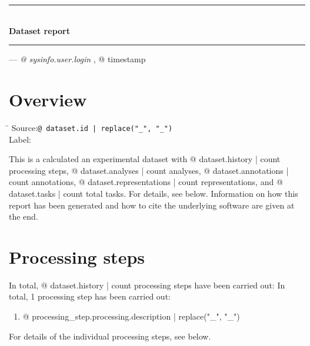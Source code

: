 

\rule[1ex]{\textwidth}{1pt}
\\[1em]
\textbf{\LARGE Dataset report}
\\[1ex]
\rule{\textwidth}{1pt}

\hfill --- \textsl{{@ sysinfo.user.login }}, {@ timestamp }

\section{Overview}

\begin{tabbing}
\hspace*{1.5cm}\=\kill
Source:\>\texttt{{@ dataset.id | replace("_", "\_") }}
\\
Label:
\end{tabbing}

This is %
a calculated %
an experimental %
dataset with
{@ dataset.history | count } processing steps,
{@ dataset.analyses | count } analyses,
{@ dataset.annotations | count } annotations,
{@ dataset.representations | count } representations, and
{@ dataset.tasks | count } total tasks.
For details, see below. Information on how this report has been generated and how to cite the underlying software are given at the end.

\section{Processing steps}

In total, {@ dataset.history | count } processing steps have been carried out:
In total, 1 processing step has been carried out:

\begin{enumerate}
\item {@ processing_step.processing.description | replace("_", "\_") }
\end{enumerate}

For details of the individual processing steps, see below.



